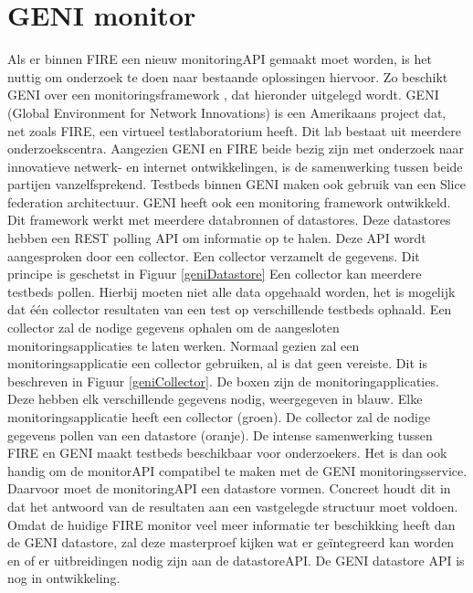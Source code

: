 \section{GENI monitor}
\npar
Als er binnen FIRE een nieuw monitoringAPI gemaakt moet worden, is het nuttig om onderzoek te doen naar bestaande oplossingen hiervoor. Zo beschikt GENI over een monitoringsframework \citep{geni-monitor}, dat hieronder uitgelegd wordt.
\npar
GENI (Global Environment for Network Innovations) is een Amerikaans project dat, net zoals FIRE, een virtueel testlaboratorium heeft. Dit lab bestaat uit meerdere onderzoekscentra. Aangezien GENI en FIRE beide bezig zijn met onderzoek naar innovatieve netwerk- en internet ontwikkelingen, is de samenwerking tussen beide partijen vanzelfsprekend.
\clearpage
\npar
Testbeds binnen GENI maken ook gebruik van een Slice federation architectuur. GENI heeft ook een monitoring framework ontwikkeld. Dit framework werkt met meerdere databronnen of datastores. Deze datastores hebben een REST polling API om informatie op te halen. Deze API wordt aangesproken door een collector. Een collector verzamelt de gegevens. Dit principe is geschetst in Figuur \ref{geniDatastore}
\npar
Een collector kan meerdere testbeds pollen. Hierbij moeten niet alle data opgehaald worden, het is mogelijk dat \'e\'en collector resultaten van een test op verschillende testbeds ophaald. Een collector zal de nodige gegevens ophalen om de aangesloten monitoringsapplicaties te laten werken. Normaal gezien zal een monitoringsapplicatie een collector gebruiken, al is dat geen vereiste. Dit is beschreven in Figuur \ref{geniCollector}. De boxen zijn de monitoringapplicaties. Deze hebben elk verschillende gegevens nodig, weergegeven in blauw. Elke monitoringsapplicatie heeft een collector (groen). De collector zal de nodige gegevens pollen van een datastore (oranje).
\npar
De intense samenwerking tussen FIRE en GENI maakt testbeds beschikbaar voor onderzoekers. Het is dan ook handig om de monitorAPI compatibel te maken met de GENI monitoringsservice. Daarvoor moet de monitoringAPI een datastore vormen. Concreet houdt dit in dat het antwoord van de resultaten aan een vastgelegde structuur moet voldoen. Omdat de huidige FIRE monitor veel meer informatie ter beschikking heeft dan de GENI datastore, zal deze masterproef kijken wat er ge\"integreerd kan worden en of er uitbreidingen nodig zijn aan de datastoreAPI. De GENI datastore API is nog in ontwikkeling.
